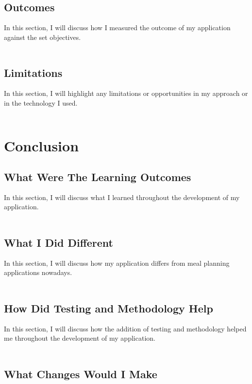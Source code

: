 \section{Outcomes}

In this section, I will discuss how I measured the outcome of my application against the set objectives.\\ \\

\section{Limitations}

In this section, I will highlight any limitations or opportunities in my approach or in the technology I used.\\ \\

\chapter{Conclusion}

\section{What Were The Learning Outcomes}

In this section, I will discuss what I learned throughout the development of my application.\\ \\

\section{What I Did Different}

In this section, I will discuss how my application differs from meal planning applications nowadays.\\ \\

\section{How Did Testing and Methodology Help}

In this section, I will discuss how the addition of testing and methodology helped me throughout the development of my application.\\ \\

\section{What Changes Would I Make}

